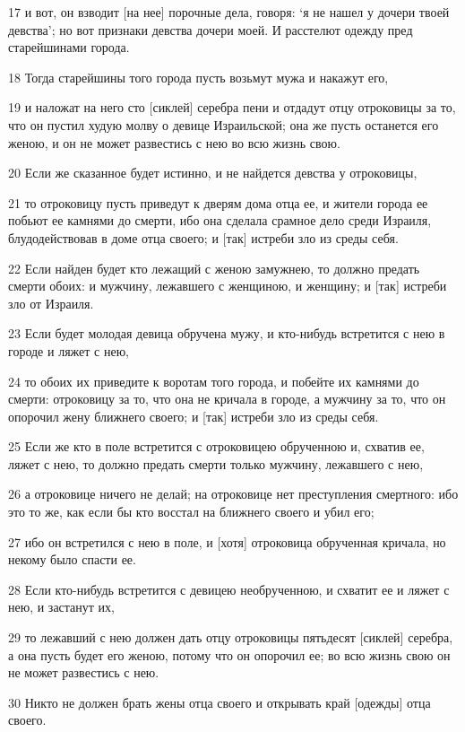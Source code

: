 \par 17 и вот, он взводит [на нее] порочные дела, говоря: `я не нашел у дочери твоей девства'; но вот признаки девства дочери моей. И расстелют одежду пред старейшинами города.
\par 18 Тогда старейшины того города пусть возьмут мужа и накажут его,
\par 19 и наложат на него сто [сиклей] серебра пени и отдадут отцу отроковицы за то, что он пустил худую молву о девице Израильской; она же пусть останется его женою, и он не может развестись с нею во всю жизнь свою.
\par 20 Если же сказанное будет истинно, и не найдется девства у отроковицы,
\par 21 то отроковицу пусть приведут к дверям дома отца ее, и жители города ее побьют ее камнями до смерти, ибо она сделала срамное дело среди Израиля, блудодействовав в доме отца своего; и [так] истреби зло из среды себя.
\par 22 Если найден будет кто лежащий с женою замужнею, то должно предать смерти обоих: и мужчину, лежавшего с женщиною, и женщину; и [так] истреби зло от Израиля.
\par 23 Если будет молодая девица обручена мужу, и кто-нибудь встретится с нею в городе и ляжет с нею,
\par 24 то обоих их приведите к воротам того города, и побейте их камнями до смерти: отроковицу за то, что она не кричала в городе, а мужчину за то, что он опорочил жену ближнего своего; и [так] истреби зло из среды себя.
\par 25 Если же кто в поле встретится с отроковицею обрученною и, схватив ее, ляжет с нею, то должно предать смерти только мужчину, лежавшего с нею,
\par 26 а отроковице ничего не делай; на отроковице нет преступления смертного: ибо это то же, как если бы кто восстал на ближнего своего и убил его;
\par 27 ибо он встретился с нею в поле, и [хотя] отроковица обрученная кричала, но некому было спасти ее.
\par 28 Если кто-нибудь встретится с девицею необрученною, и схватит ее и ляжет с нею, и застанут их,
\par 29 то лежавший с нею должен дать отцу отроковицы пятьдесят [сиклей] серебра, а она пусть будет его женою, потому что он опорочил ее; во всю жизнь свою он не может развестись с нею.
\par 30 Никто не должен брать жены отца своего и открывать край [одежды] отца своего.

